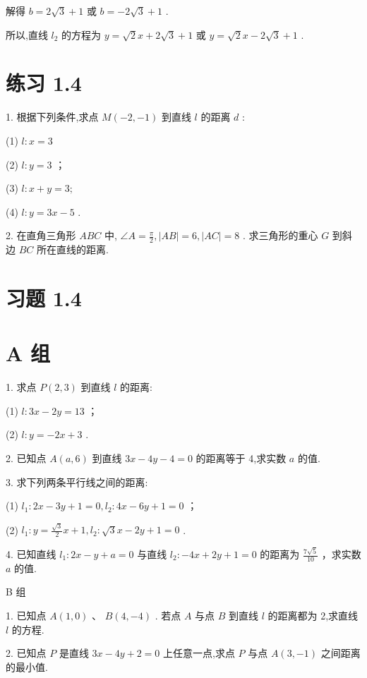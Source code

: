 \documentclass[10pt]{article}
\begin{document}
解得 \(b = 2\sqrt{3} + 1\) 或 \(b =  - 2\sqrt{3} + 1\) .

所以,直线 \({l}_{2}\) 的方程为 \(y = \sqrt{2}x + 2\sqrt{3} + 1\) 或 \(y = \sqrt{2}x - 2\sqrt{3} + 1\) .

\section*{练习 1.4}

1. 根据下列条件,求点 \(M\left( {-2, - 1}\right)\) 到直线 \(l\) 的距离 \(d\) :

(1) \(l : x = 3\)

(2) \(l : y = 3\) ；

(3) \(l : {x + y} = {3;}\)

(4) \(l : y = {3x} - 5\) .

2. 在直角三角形 \({ABC}\) 中, \(\angle A = \frac{\pi }{2},\left| {AB}\right|  = 6,\left| {AC}\right|  = 8\) . 求三角形的重心 \(G\) 到斜边 \({BC}\) 所在直线的距离.

\section*{习题 1.4}

\section*{A 组}

1. 求点 \(P\left( {2,3}\right)\) 到直线 \(l\) 的距离:

(1) \(l : {3x} - {2y} = {13}\) ；

(2) \(l : y =  - {2x} + 3\) .

2. 已知点 \(A\left( {a,6}\right)\) 到直线 \({3x} - {4y} - 4 = 0\) 的距离等于 4,求实数 \(a\) 的值.

3. 求下列两条平行线之间的距离:

(1) \({l}_{1} : {2x} - {3y} + 1 = 0,{l}_{2} : {4x} - {6y} + 1 = 0\) ；

(2) \({l}_{1} : y = \frac{\sqrt{3}}{2}x + 1,{l}_{2} : \sqrt{3}x - {2y} + 1 = 0\) .

4. 已知直线 \({l}_{1} : {2x} - y + a = 0\) 与直线 \({l}_{2} :  - {4x} + {2y} + 1 = 0\) 的距离为 \(\frac{7\sqrt{5}}{10}\) ，求实数 \(a\) 的值.

B 组

1. 已知点 \(A\left( {1,0}\right) \text{ 、 }B\left( {4, - 4}\right)\) . 若点 \(A\) 与点 \(B\) 到直线 \(l\) 的距离都为 2,求直线 \(l\) 的方程.

2. 已知点 \(P\) 是直线 \({3x} - {4y} + 2 = 0\) 上任意一点,求点 \(P\) 与点 \(A\left( {3, - 1}\right)\) 之间距离的最小值.
\end{document}
